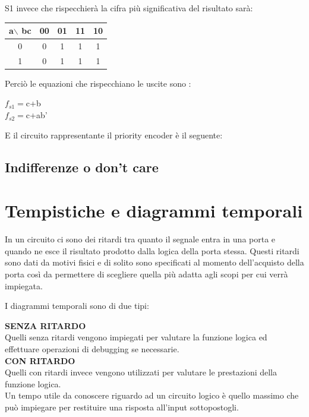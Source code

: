 \documentclass[a4paper]{book}
\begin{document}
S1 invece che rispecchierà la cifra più significativa del risultato sarà:

\begin{tabular}{|c|c|c|c|c|}
a$\backslash$ bc & 00 & 01 & 11 & 10 \\
\hline
0              & 0  & \cellcolor{yellow}1  &  \cellcolor{yellow}1 & \cellcolor{yellow}1  \\
\hline
1              & 0  & \cellcolor{yellow}1  &  \cellcolor{yellow}1 & \cellcolor{yellow}1  \\
\hline

\end{tabular}


Perciò le equazioni che rispecchiano le uscite sono :

\(f_{s1}=\)c+b \\
\(f_{s2}=\)c+ab'


E il circuito rappresentante il priority encoder è il seguente:


\section{Indifferenze o don't care}

\chapter{Tempistiche e diagrammi temporali}

In un circuito ci sono dei ritardi tra quanto il segnale entra in una porta e quando ne esce il risultato prodotto dalla logica della porta stessa.
Questi ritardi sono dati da motivi fisici e di solito sono specificati al momento dell'acquisto della porta così da permettere di scegliere quella più adatta agli scopi per cui verrà impiegata.

I diagrammi temporali sono di due tipi:
 
\textbf{SENZA RITARDO}\\
Quelli senza ritardi vengono impiegati per valutare la funzione logica ed effettuare operazioni di debugging se necessarie.\\
\textbf{CON RITARDO}\\
Quelli con ritardi invece vengono utilizzati per valutare le prestazioni della funzione logica.\\

Un tempo utile da conoscere riguardo ad un circuito logico è quello massimo che può impiegare per restituire una risposta all'input sottopostogli.
\end{document}
